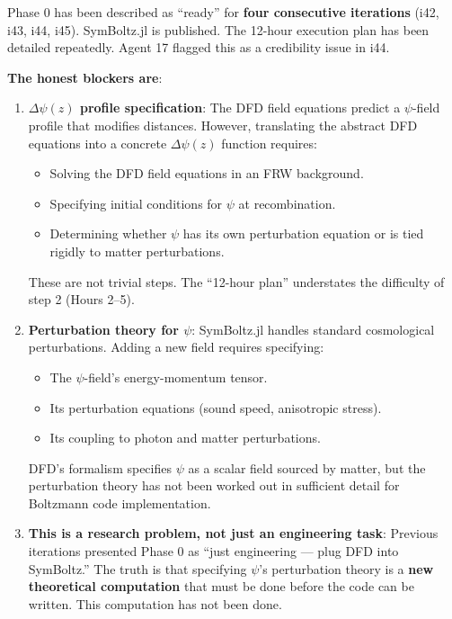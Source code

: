 \documentclass[11pt,a4paper]{article}
\begin{document}
\begin{tcolorbox}[colback=red!5!white, colframe=red!60!black,
  title={PHASE 0 HONEST RECKONING: Why It Has Not Happened}]

Phase 0 has been described as ``ready'' for \textbf{four consecutive iterations} (i42, i43, i44, i45). SymBoltz.jl is published. The 12-hour execution plan has been detailed repeatedly. Agent 17 flagged this as a credibility issue in i44.

\textbf{The honest blockers are}:

\begin{enumerate}
\item \textbf{$\Delta\psi(z)$ profile specification}: The DFD field equations predict a $\psi$-field profile that modifies distances. However, translating the abstract DFD equations into a concrete $\Delta\psi(z)$ function requires:
\begin{itemize}
\item Solving the DFD field equations in an FRW background.
\item Specifying initial conditions for $\psi$ at recombination.
\item Determining whether $\psi$ has its own perturbation equation or is tied rigidly to matter perturbations.
\end{itemize}
These are not trivial steps. The ``12-hour plan'' understates the difficulty of step 2 (Hours 2--5).

\item \textbf{Perturbation theory for $\psi$}: SymBoltz.jl handles standard cosmological perturbations. Adding a new field requires specifying:
\begin{itemize}
\item The $\psi$-field's energy-momentum tensor.
\item Its perturbation equations (sound speed, anisotropic stress).
\item Its coupling to photon and matter perturbations.
\end{itemize}
DFD's formalism specifies $\psi$ as a scalar field sourced by matter, but the perturbation theory has not been worked out in sufficient detail for Boltzmann code implementation.

\item \textbf{This is a research problem, not just an engineering task}: Previous iterations presented Phase 0 as ``just engineering --- plug DFD into SymBoltz.'' The truth is that specifying $\psi$'s perturbation theory is a \textbf{new theoretical computation} that must be done before the code can be written. This computation has not been done.
\end{enumerate}


\end{tcolorbox}
\end{document}

